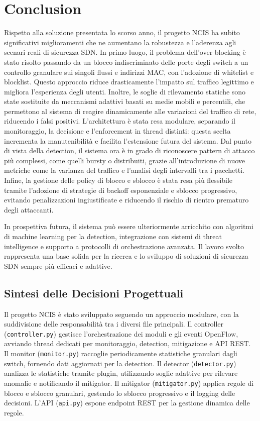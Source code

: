\chapter{Conclusion}
Rispetto alla soluzione presentata lo scorso anno, il progetto NCIS ha subito significativi miglioramenti che ne aumentano la robustezza e l’aderenza agli scenari reali di sicurezza SDN. In primo luogo, il problema dell’over blocking è stato risolto passando da un blocco indiscriminato delle porte degli switch a un controllo granulare sui singoli flussi e indirizzi MAC, con l’adozione di whitelist e blocklist. Questo approccio riduce drasticamente l’impatto sul traffico legittimo e migliora l’esperienza degli utenti. Inoltre, le soglie di rilevamento statiche sono state sostituite da meccanismi adattivi basati su medie mobili e percentili, che permettono al sistema di reagire dinamicamente alle variazioni del traffico di rete, riducendo i falsi positivi. L’architettura è stata resa modulare, separando il monitoraggio, la decisione e l’enforcement in thread distinti: questa scelta incrementa la manutenibilità e facilita l’estensione futura del sistema. Dal punto di vista della detection, il sistema ora è in grado di riconoscere pattern di attacco più complessi, come quelli bursty o distribuiti, grazie all’introduzione di nuove metriche come la varianza del traffico e l’analisi degli intervalli tra i pacchetti. Infine, la gestione delle policy di blocco e sblocco è stata resa più flessibile tramite l’adozione di strategie di backoff esponenziale e sblocco progressivo, evitando penalizzazioni ingiustificate e riducendo il rischio di rientro prematuro degli attaccanti.\par
In prospettiva futura, il sistema può essere ulteriormente arricchito con algoritmi di machine learning per la detection, integrazione con sistemi di threat intelligence e supporto a protocolli di orchestrazione avanzata. Il lavoro svolto rappresenta una base solida per la ricerca e lo sviluppo di soluzioni di sicurezza SDN sempre più efficaci e adattive.

\section{Sintesi delle Decisioni Progettuali}

Il progetto NCIS è stato sviluppato seguendo un approccio modulare, con la suddivisione delle responsabilità tra i diversi file principali. Il controller (\texttt{controller.py}) gestisce l’orchestrazione dei moduli e gli eventi OpenFlow, avviando thread dedicati per monitoraggio, detection, mitigazione e API REST. Il monitor (\texttt{monitor.py}) raccoglie periodicamente statistiche granulari dagli switch, fornendo dati aggiornati per la detection. Il detector (\texttt{detector.py}) analizza le statistiche tramite plugin, utilizzando soglie adattive per rilevare anomalie e notificando il mitigator. Il mitigator (\texttt{mitigator.py}) applica regole di blocco e sblocco granulari, gestendo lo sblocco progressivo e il logging delle decisioni. L’API (\texttt{api.py}) espone endpoint REST per la gestione dinamica delle regole.

